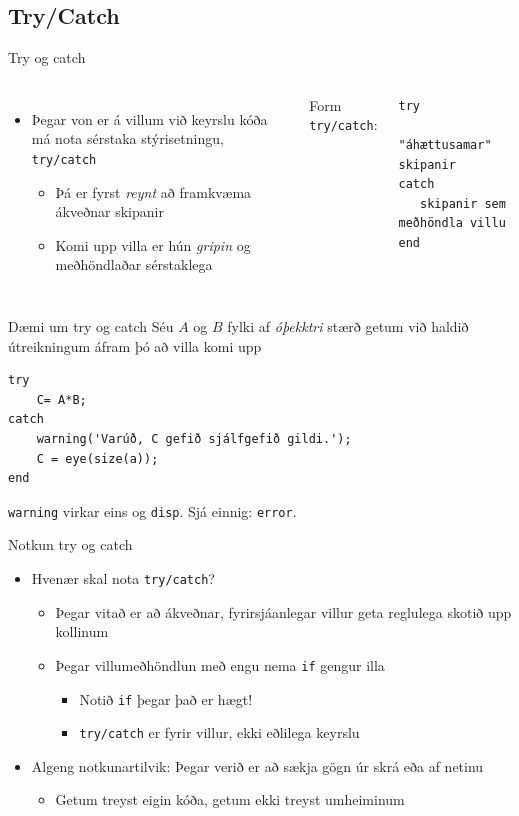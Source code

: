 \documentclass{beamer}
\begin{document}
\subsection{Try/Catch}

\begin{frame}[fragile]{Try og catch}
\begin{columns}
\begin{itemize}
 \item Þegar von er á villum við keyrslu kóða má nota sérstaka stýrisetningu, \texttt{try/catch}
 \begin{itemize}
  \item Þá er fyrst \emph{reynt} að framkvæma ákveðnar skipanir
  \item Komi upp villa er hún \emph{gripin} og meðhöndlaðar sérstaklega
 \end{itemize}
\end{itemize}
Form \texttt{try/catch}:
\begin{verbatim}
try
   "áhættusamar" skipanir
catch
   skipanir sem meðhöndla villu
end
\end{verbatim}
\end{columns}
\end{frame}

\begin{frame}[fragile]{Dæmi um try og catch}
Séu $A$ og $B$ fylki af \emph{óþekktri} stærð getum við haldið útreikningum áfram þó að villa komi upp
\begin{verbatim}
try
    C= A*B;
catch
    warning('Varúð, C gefið sjálfgefið gildi.');
    C = eye(size(a));
end

\end{verbatim}
\texttt{warning} virkar eins og \texttt{disp}. Sjá einnig: \texttt{error}.
\end{frame}


\begin{frame}[fragile]{Notkun try og catch}
\begin{itemize}
 \item Hvenær skal nota \texttt{try/catch}?
 \begin{itemize}
  \item Þegar vitað er að ákveðnar, fyrirsjáanlegar villur geta reglulega skotið upp kollinum
  \item Þegar villumeðhöndlun með engu nema \texttt{if} gengur illa
  \begin{itemize}
   \item Notið \texttt{if} þegar það er hægt!
   \item \texttt{try/catch} er fyrir villur, ekki eðlilega keyrslu
  \end{itemize}
 \end{itemize}
 \item Algeng notkunartilvik: Þegar verið er að sækja gögn úr skrá eða af netinu
 \begin{itemize}
  \item Getum treyst eigin kóða, getum ekki treyst umheiminum
 \end{itemize}
\end{itemize}
\end{frame}
\end{document}
